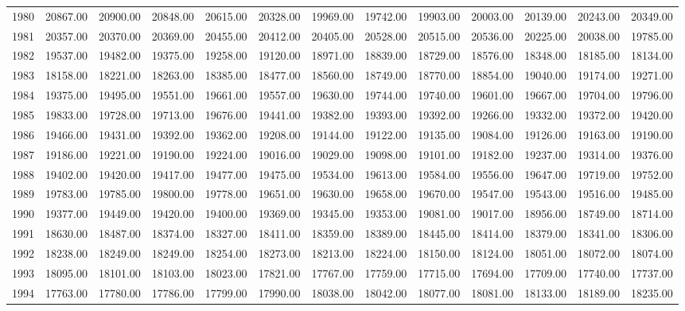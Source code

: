 \begin{longtable}{rrrrrrrrrrrrr}
  1980 & 20867.00 & 20900.00 & 20848.00 & 20615.00 & 20328.00 & 19969.00 & 19742.00 & 19903.00 & 20003.00 & 20139.00 & 20243.00 & 20349.00 \\ 
  1981 & 20357.00 & 20370.00 & 20369.00 & 20455.00 & 20412.00 & 20405.00 & 20528.00 & 20515.00 & 20536.00 & 20225.00 & 20038.00 & 19785.00 \\ 
  1982 & 19537.00 & 19482.00 & 19375.00 & 19258.00 & 19120.00 & 18971.00 & 18839.00 & 18729.00 & 18576.00 & 18348.00 & 18185.00 & 18134.00 \\ 
  1983 & 18158.00 & 18221.00 & 18263.00 & 18385.00 & 18477.00 & 18560.00 & 18749.00 & 18770.00 & 18854.00 & 19040.00 & 19174.00 & 19271.00 \\ 
  1984 & 19375.00 & 19495.00 & 19551.00 & 19661.00 & 19557.00 & 19630.00 & 19744.00 & 19740.00 & 19601.00 & 19667.00 & 19704.00 & 19796.00 \\ 
  1985 & 19833.00 & 19728.00 & 19713.00 & 19676.00 & 19441.00 & 19382.00 & 19393.00 & 19392.00 & 19266.00 & 19332.00 & 19372.00 & 19420.00 \\ 
  1986 & 19466.00 & 19431.00 & 19392.00 & 19362.00 & 19208.00 & 19144.00 & 19122.00 & 19135.00 & 19084.00 & 19126.00 & 19163.00 & 19190.00 \\ 
  1987 & 19186.00 & 19221.00 & 19190.00 & 19224.00 & 19016.00 & 19029.00 & 19098.00 & 19101.00 & 19182.00 & 19237.00 & 19314.00 & 19376.00 \\ 
  1988 & 19402.00 & 19420.00 & 19417.00 & 19477.00 & 19475.00 & 19534.00 & 19613.00 & 19584.00 & 19556.00 & 19647.00 & 19719.00 & 19752.00 \\ 
  1989 & 19783.00 & 19785.00 & 19800.00 & 19778.00 & 19651.00 & 19630.00 & 19658.00 & 19670.00 & 19547.00 & 19543.00 & 19516.00 & 19485.00 \\ 
  1990 & 19377.00 & 19449.00 & 19420.00 & 19400.00 & 19369.00 & 19345.00 & 19353.00 & 19081.00 & 19017.00 & 18956.00 & 18749.00 & 18714.00 \\ 
  1991 & 18630.00 & 18487.00 & 18374.00 & 18327.00 & 18411.00 & 18359.00 & 18389.00 & 18445.00 & 18414.00 & 18379.00 & 18341.00 & 18306.00 \\ 
  1992 & 18238.00 & 18249.00 & 18249.00 & 18254.00 & 18273.00 & 18213.00 & 18224.00 & 18150.00 & 18124.00 & 18051.00 & 18072.00 & 18074.00 \\ 
  1993 & 18095.00 & 18101.00 & 18103.00 & 18023.00 & 17821.00 & 17767.00 & 17759.00 & 17715.00 & 17694.00 & 17709.00 & 17740.00 & 17737.00 \\ 
  1994 & 17763.00 & 17780.00 & 17786.00 & 17799.00 & 17990.00 & 18038.00 & 18042.00 & 18077.00 & 18081.00 & 18133.00 & 18189.00 & 18235.00 \\ 

\end{longtable}

